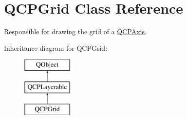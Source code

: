 \hypertarget{class_q_c_p_grid}{}\section{Q\+C\+P\+Grid Class Reference}
\label{class_q_c_p_grid}


Responsible for drawing the grid of a \mbox{\hyperlink{class_q_c_p_axis}{Q\+C\+P\+Axis}}.  


Inheritance diagram for Q\+C\+P\+Grid\+:\begin{figure}[H]
\begin{center}
\leavevmode
\includegraphics[height=3.000000cm]{class_q_c_p_grid}
\end{center}
\end{figure}
